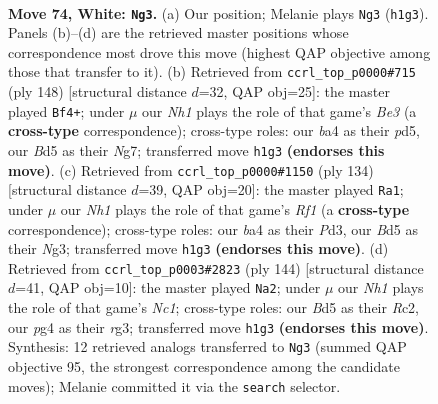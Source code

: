 \documentclass[11pt]{article}
\begin{document}
\clearpage

\begin{figure}[p]\centering
\begin{subfigure}{0.46\textwidth}\centering
\resizebox{\linewidth}{!}{%
\newchessgame
\chessboard[
  setfen={8/r4p2/n5p1/3BP2p/b4Pp1/3k4/5K1P/7N w - - 6 74},
  showmover=false,
  pgfstyle=straightmove, color=movearrow, markmove={h1-g3}
]}
\caption{}
\end{subfigure}\hfill
\begin{subfigure}{0.46\textwidth}\centering
\resizebox{\linewidth}{!}{%
\newchessgame
\chessboard[
  setfen={6b1/2k3N1/2p2K2/rp1p3p/3P4/4B1P1/8/3B4 w - - 2 75},
  showmover=false,
  pgfstyle=straightmove, color=movearrow, markmove={e3-f4}
]}
\caption{}
\end{subfigure}
\\[4pt]
\begin{subfigure}{0.46\textwidth}\centering
\resizebox{\linewidth}{!}{%
\newchessgame
\chessboard[
  setfen={8/3rb3/6k1/1pp4p/3p4/1P1P2NK/2P5/5R2 w - - 3 68},
  showmover=false,
  pgfstyle=straightmove, color=movearrow, markmove={f1-a1}
]}
\caption{}
\end{subfigure}\hfill
\begin{subfigure}{0.46\textwidth}\centering
\resizebox{\linewidth}{!}{%
\newchessgame
\chessboard[
  setfen={8/8/4p3/1pB1p1k1/1Pn1Pp2/6r1/2R5/2N1K3 w - - 4 73},
  showmover=false,
  pgfstyle=straightmove, color=movearrow, markmove={c1-a2}
]}
\caption{}
\end{subfigure}
\caption{\textbf{Move 74, White: \texttt{Ng3}.} (a) Our position; Melanie plays \texttt{Ng3} (\texttt{h1g3}). Panels (b)--(d) are the retrieved master positions whose correspondence most drove this move (highest QAP objective among those that transfer to it). (b) Retrieved from \texttt{ccrl\_top\_p0000\#715} (ply 148) [structural distance $d$=32, QAP obj=25]: the master played \texttt{Bf4+}; under $\mu$ our \emph{Nh1} plays the role of that game's \emph{Be3} (a \textbf{cross-type} correspondence); cross-type roles: our \emph{b}a4 as their \emph{p}d5, our \emph{B}d5 as their \emph{N}g7; transferred move \texttt{h1g3} \textbf{(endorses this move)}. (c) Retrieved from \texttt{ccrl\_top\_p0000\#1150} (ply 134) [structural distance $d$=39, QAP obj=20]: the master played \texttt{Ra1}; under $\mu$ our \emph{Nh1} plays the role of that game's \emph{Rf1} (a \textbf{cross-type} correspondence); cross-type roles: our \emph{b}a4 as their \emph{P}d3, our \emph{B}d5 as their \emph{N}g3; transferred move \texttt{h1g3} \textbf{(endorses this move)}. (d) Retrieved from \texttt{ccrl\_top\_p0003\#2823} (ply 144) [structural distance $d$=41, QAP obj=10]: the master played \texttt{Na2}; under $\mu$ our \emph{Nh1} plays the role of that game's \emph{Nc1}; cross-type roles: our \emph{B}d5 as their \emph{R}c2, our \emph{p}g4 as their \emph{r}g3; transferred move \texttt{h1g3} \textbf{(endorses this move)}. Synthesis: 12 retrieved analogs transferred to \texttt{Ng3} (summed QAP objective 95, the strongest correspondence among the candidate moves); Melanie committed it via the \texttt{search} selector.}
\label{fig:thought-m146}
\end{figure}
\end{document}
